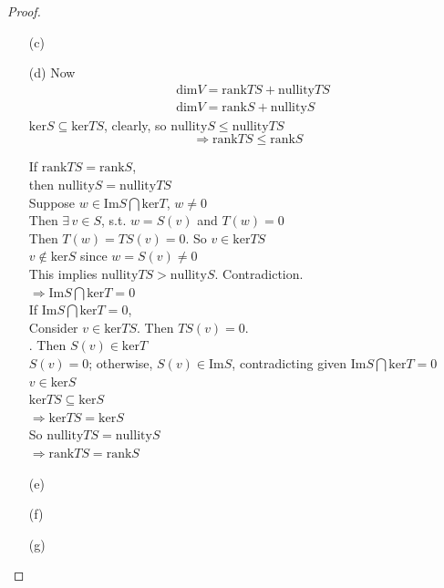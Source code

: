 \documentclass[10pt]{amsart}
\begin{document}
\begin{multicols*}{2}
\begin{proof}
\begin{enumerate}
		\item[(c)]
		\item[(d)] Now 
		\[
		\begin{aligned}
		& \text{dim}V = \text{rank}TS + \text{nullity}TS \\ 
		&  \text{dim}V = \text{rank}S + \text{nullity}S
		\end{aligned}
		\]
		$\text{ker}S \subseteq \text{ker}TS$, clearly, so $\text{nullity}S \leq \text{nullity}TS$ 
		\[
		\Longrightarrow \boxed{ \text{rank}TS \leq \text{rank}S } 
		\]
		
		If $\text{rank}TS = \text{rank}S$, \\
		\phantom{ \quad } then $\text{nullity}S = \text{nullity}TS$ \\
		\phantom{ \, } Suppose $w \in \text{Im}S \bigcap \text{ker}T$, $w \neq 0$ \\
		\phantom{ \quad } Then $\exists \,  v\in S$, s.t. $w = S(v)$ and $T(w)=0$ \\
		\phantom{ \quad \, } Then $T(w) = TS(v) =0$.  So $v\in \text{ker}TS$ \\
		\phantom{ \quad \quad \, } $v\notin \text{ker}S$ since $w = S(v) \neq 0$ \\
		\phantom{ \quad \quad \, } This implies $\text{nullity}TS > \text{nullity}S$.  Contradiction. \\
		$\Longrightarrow \text{Im}S \bigcap \text{ker}T =0$ \\
		
		If $\text{Im}S \bigcap \text{ker}T =0$, \\
		\phantom{ \quad } Consider $v \in \text{ker}TS$.  Then $TS(v)=0$.  \\
		.  Then $S(v)  \in \text{ker}T$ \\
		\phantom{ \quad  } $S(v) =0$; otherwise, $S(v) \in \text{Im}S$, contradicting given $\text{Im}S \bigcap \text{ker}T =0$ \\
		\phantom{ \quad \quad } $v\in \text{ker}S$ \\
		
		$\text{ker}TS \subseteq \text{ker}S$\\
		$\Longrightarrow \text{ker}TS = \text{ker}S$ \\
		So $\text{nullity}TS = \text{nullity}S$  \\
		$\Longrightarrow \text{rank}TS = \text{rank}S$ 
		
		\item[(e)]
		\item[(f)]
		\item[(g)]
	\end{enumerate}
\end{proof}



\end{multicols*}
\end{document}

